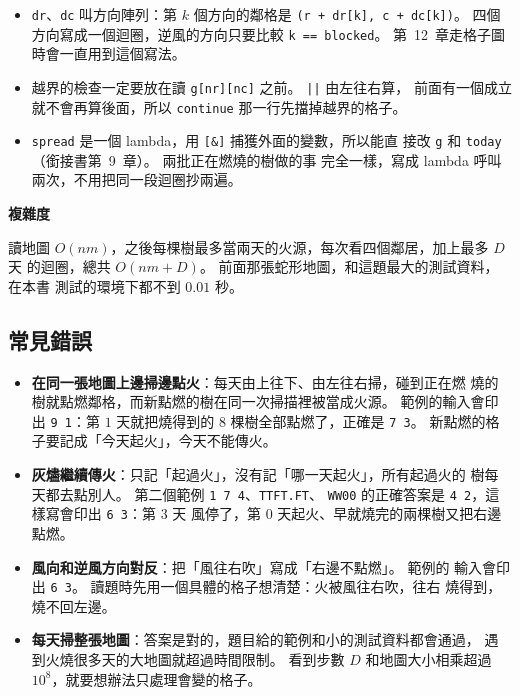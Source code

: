 
\begin{itemize}
\item \texttt{dr}、\texttt{dc} 叫方向陣列：第 $k$ 個方向的鄰格是
\texttt{(r + dr[k], c + dc[k])}。 四個方向寫成一個迴圈，逆風的方向只要比較
\texttt{k == blocked}。 第~12~章走格子圖時會一直用到這個寫法。
\item 越界的檢查一定要放在讀 \texttt{g[nr][nc]} 之前。 \texttt{||} 由左往右算，
前面有一個成立就不會再算後面，所以 \texttt{continue} 那一行先擋掉越界的格子。
\item \texttt{spread} 是一個 lambda，用 \texttt{[\&]} 捕獲外面的變數，所以能直
接改 \texttt{g} 和 \texttt{today}（銜接書第~9~章）。 兩批正在燃燒的樹做的事
完全一樣，寫成 lambda 呼叫兩次，不用把同一段迴圈抄兩遍。
\end{itemize}

\textbf{複雜度}

讀地圖 $O(nm)$，之後每棵樹最多當兩天的火源，每次看四個鄰居，加上最多 $D$ 天
的迴圈，總共 $O(nm + D)$。 前面那張蛇形地圖，和這題最大的測試資料，在本書
測試的環境下都不到 $0.01$ 秒。

\subsection{常見錯誤}

\begin{itemize}
\item \textbf{在同一張地圖上邊掃邊點火}：每天由上往下、由左往右掃，碰到正在燃
燒的樹就點燃鄰格，而新點燃的樹在同一次掃描裡被當成火源。 範例的輸入會印出
\texttt{9 1}：第 $1$ 天就把燒得到的 $8$ 棵樹全部點燃了，正確是 \texttt{7 3}。
新點燃的格子要記成「今天起火」，今天不能傳火。
\item \textbf{灰燼繼續傳火}：只記「起過火」，沒有記「哪一天起火」，所有起過火的
樹每天都去點別人。 第二個範例 \texttt{1 7 4}、\texttt{TTFT.FT}、
\texttt{WW00} 的正確答案是 \texttt{4 2}，這樣寫會印出 \texttt{6 3}：第 $3$ 天
風停了，第 $0$ 天起火、早就燒完的兩棵樹又把右邊點燃。
\item \textbf{風向和逆風方向對反}：把「風往右吹」寫成「右邊不點燃」。 範例的
輸入會印出 \texttt{6 3}。 讀題時先用一個具體的格子想清楚：火被風往右吹，往右
燒得到，燒不回左邊。
\item \textbf{每天掃整張地圖}：答案是對的，題目給的範例和小的測試資料都會通過，
遇到火燒很多天的大地圖就超過時間限制。 看到步數 $D$ 和地圖大小相乘超過
$10^8$，就要想辦法只處理會變的格子。
\end{itemize}

